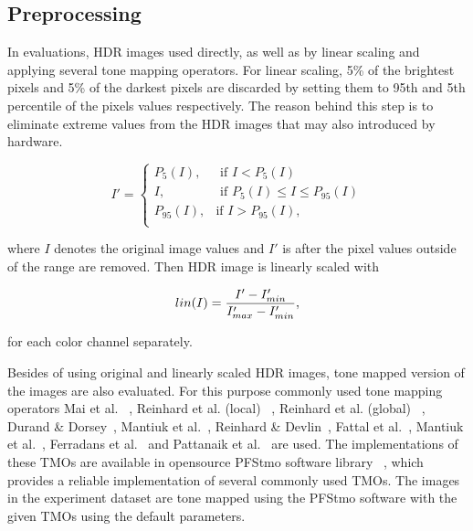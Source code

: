 \subsection{Preprocessing}
In evaluations, HDR images used directly, as well as by linear scaling and applying several tone mapping operators. For linear scaling, 5\% of the brightest pixels and 5\% of the darkest pixels are discarded by setting them to 95th and 5th percentile of the pixels values respectively. The reason behind this step is to eliminate extreme values from the HDR images that may also introduced by hardware. 

\begin{equation}
    I' = \begin{cases}
    P_5 (I), &\text{ if $I < P_5(I)$} \\
    I, &\text{ if $P_5(I) \leq I \leq P_{95}(I) $} \\
    P_{95}(I), &\text{if $I > P_{95}(I)$}, \\
    \end{cases}
\end{equation}

where $I$ denotes the original image values and $I'$ is after the pixel values outside of the range are removed. Then HDR image is linearly scaled with

\begin{equation}
    lin(I)  = {{I' - I'_{min}} \over {I'_{max} - I'_{min}}}, 
\end{equation}

for each color channel separately.

Besides of using original and linearly scaled HDR images, tone mapped version of the images are also evaluated. For this purpose commonly used tone mapping operators Mai et al. ~\cite{mai2010optimizing}, Reinhard et al. (local) ~\cite{reinhard2002photographic}, Reinhard et al. (global) ~\cite{reinhard2002photographic}, Durand \& Dorsey~\cite{durand2002fast}, Mantiuk et al.~\cite{mantiuk2006perceptual}, Reinhard \& Devlin~\cite{reinhard2005dynamic}, Fattal et al.~\cite{durand2002fast}, Mantiuk et al.~\cite{mantiuk2008display}, Ferradans et al.~\cite{ferradans2011analysis} and Pattanaik et al.~\cite{pattanaik2000time} are used. The implementations of these TMOs are available in opensource PFStmo software library ~\cite{mantiuk2007high}, which provides a reliable implementation of several commonly used TMOs. The images in the experiment dataset are tone mapped using the PFStmo software with the given TMOs using the default parameters.


